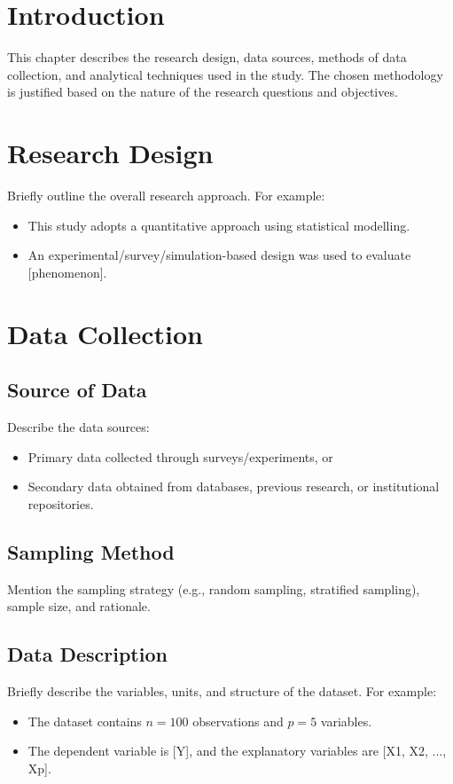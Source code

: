 \section{Introduction}
This chapter describes the research design, data sources, methods of data collection, and analytical techniques used in the study. The chosen methodology is justified based on the nature of the research questions and objectives.

\section{Research Design}
Briefly outline the overall research approach. For example:
\begin{itemize}
    \item This study adopts a quantitative approach using statistical modelling.
    \item An experimental/survey/simulation-based design was used to evaluate [phenomenon].
\end{itemize}

\section{Data Collection}
\subsection{Source of Data}
Describe the data sources:
\begin{itemize}
    \item Primary data collected through surveys/experiments, or
    \item Secondary data obtained from databases, previous research, or institutional repositories.
\end{itemize}

\subsection{Sampling Method}
Mention the sampling strategy (e.g., random sampling, stratified sampling), sample size, and rationale.

\subsection{Data Description}
Briefly describe the variables, units, and structure of the dataset. For example:
\begin{itemize}
    \item The dataset contains $n = 100$ observations and $p = 5$ variables.
    \item The dependent variable is [Y], and the explanatory variables are [X1, X2, ..., Xp].
\end{itemize}

